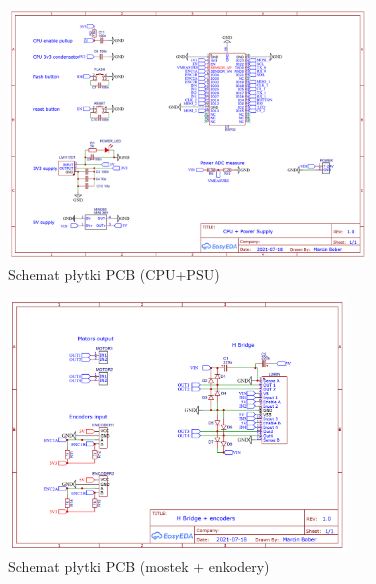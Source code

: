                 \begin{landscape}
                    \begin{figure}
                      \centering
                      \includegraphics[width=0.85\textwidth]{img/pcb1.png}
                      \caption{Schemat płytki PCB (CPU+PSU)}
                      \label{fig:pcb_schematic_1}
                    \end{figure}
                \end{landscape}
                
                \begin{landscape}
                    \begin{figure}
                      \centering
                      \includegraphics[width=0.80\textwidth]{img/pcb2.png}
                      \caption{Schemat płytki PCB (mostek + enkodery)}
                      \label{fig:pcb_schematic_2}
                    \end{figure}
                \end{landscape}
        
